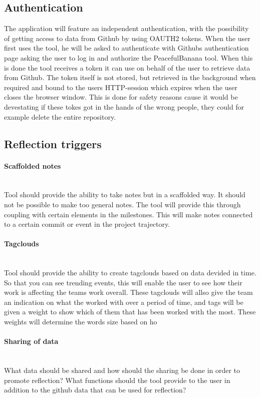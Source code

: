 \subsection{Authentication}
The application will feature an independent authentication, with the possibility of getting access to data from Github by using OAUTH2 tokens. When the user first uses the tool, he will be asked to authenticate with Githubs authentication page asking the user to log in and authorize the PeacefulBanana tool. When this is done the tool receives a token it can use on behalf of the user to retrieve data from Github. The token itself is not stored, but retrieved in the background when required and bound to the users HTTP-session which expires when the user closes the browser window. This is done for safety reasons cause it would be devestating if these tokes got in the hands of the wrong people, they could for example delete the entire repository.

\subsection{Reflection triggers}
\paragraph{Scaffolded notes}\mbox{}\\
Tool should provide the ability to take notes but in a scaffolded way. It should not be possible to make too general notes. The tool will provide this through coupling with certain elements in the milestones. This will make notes connected to a certain commit or event in the project trajectory. 

\paragraph{Tagclouds}\mbox{}\\
Tool should provide the ability to create tagclouds based on data devided in time. So that you can see trending events, this will enable the user to see how their work is affecting the teams work overall. These tagclouds will allso give the team an indication on what the worked with over a period of time, and tags will be given a weight to show which of them that has been worked with the most. These weights will determine the words size based on ho

\paragraph{Sharing of data}\mbox{}\\
What data should be shared and how should the sharing be done in order to promote reflection? What functions should the tool provide to the user in addition to the github data that can be used for reflection?

